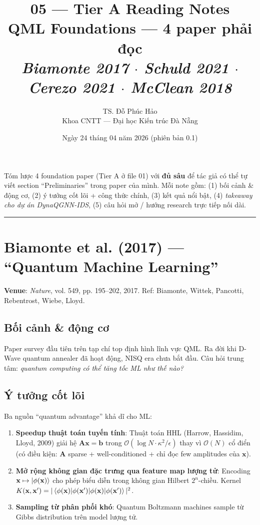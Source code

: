 \documentclass[11pt,a4paper]{article}
\title{\vspace{-1.5cm}\textbf{\color{accent} 05 --- Tier A Reading Notes} \\[3pt]
       \Large QML Foundations --- 4 paper phải đọc \\[2pt]
       \normalsize \textit{Biamonte 2017 $\cdot$ Schuld 2021 $\cdot$ Cerezo 2021 $\cdot$ McClean 2018}}
\author{TS. Đỗ Phúc Hảo \\ \small Khoa CNTT --- Đại học Kiến trúc Đà Nẵng}
\date{Ngày 24 tháng 04 năm 2026 (phiên bản 0.1)}
\begin{document}
\maketitle
\thispagestyle{fancy}

\begin{note}
Tóm lược 4 foundation paper (Tier A ở file 01) với \textbf{đủ sâu} để tác giả có thể tự viết section ``Preliminaries'' trong paper của mình. Mỗi note gồm: (1) bối cảnh \& động cơ, (2) ý tưởng cốt lõi + công thức chính, (3) kết quả nổi bật, (4) \textit{takeaway cho dự án DynaQGNN-IDS}, (5) câu hỏi mở / hướng research trực tiếp nối dài.
\end{note}

\tableofcontents
\vspace{0.4cm}
\hrule
\vspace{0.4cm}

\section{Biamonte et al. (2017) --- ``Quantum Machine Learning''}

\textbf{Venue}: \textit{Nature}, vol. 549, pp. 195--202, 2017. Ref: Biamonte, Wittek, Pancotti, Rebentrost, Wiebe, Lloyd.

\subsection{Bối cảnh \& động cơ}

Paper survey đầu tiên trên tạp chí top định hình lĩnh vực QML. Ra đời khi D-Wave quantum annealer đã hoạt động, NISQ era chưa bắt đầu. Câu hỏi trung tâm: \textit{quantum computing có thể tăng tốc ML như thế nào?}

\subsection{Ý tưởng cốt lõi}

Ba nguồn ``quantum advantage'' khả dĩ cho ML:

\begin{enumerate}
  \item \textbf{Speedup thuật toán tuyến tính}:
    Thuật toán HHL (Harrow, Hassidim, Lloyd, 2009) giải hệ $\mathbf{A}\mathbf{x} = \mathbf{b}$ trong $\mathcal{O}(\log N \cdot \kappa^2 / \epsilon)$ thay vì $\mathcal{O}(N)$ cổ điển (có điều kiện: $\mathbf{A}$ sparse + well-conditioned + chỉ đọc few amplitudes của $\mathbf{x}$).
  \item \textbf{Mở rộng không gian đặc trưng qua feature map lượng tử}:
    Encoding $\mathbf{x} \mapsto \ket{\phi(\mathbf{x})}$ cho phép biểu diễn trong không gian Hilbert $2^n$-chiều. Kernel $K(\mathbf{x}, \mathbf{x}') = |\braket{\phi(\mathbf{x})|\phi(\mathbf{x}')}|^2$.
  \item \textbf{Sampling từ phân phối khó}:
    Quantum Boltzmann machines sample từ Gibbs distribution trên model lượng tử.
\end{enumerate}
\end{document}
